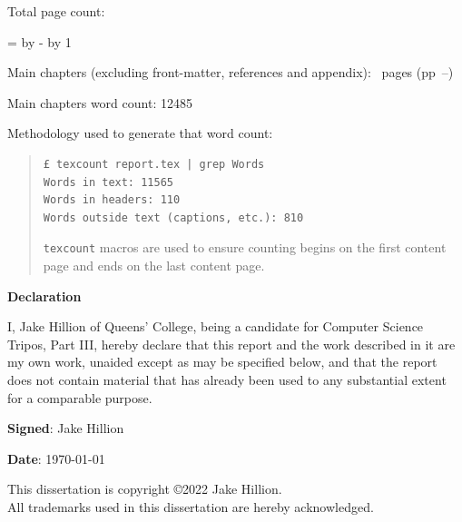 \documentclass[12pt,a4paper,twoside]{report}
\newif\ifsubmission %
\begin{document}
\begin{sffamily}
\newpage

Total page count: \pageref{lastpage}

\makeatletter
\@tempcnta=\relax%
\advance\@tempcnta by -%
\advance\@tempcnta by 1%
\xdef\contentpages{\the\@tempcnta}%
\makeatother

Main chapters (excluding front-matter, references and appendix):
\contentpages~pages
(pp~\pageref{firstcontentpage}--\pageref{lastcontentpage})

Main chapters word count: 12485

Methodology used to generate that word count:

\begin{quote}
\begin{verbatim}
£ texcount report.tex | grep Words
Words in text: 11565
Words in headers: 110
Words outside text (captions, etc.): 810
\end{verbatim}

\texttt{texcount} macros are used to ensure counting begins on the first content page and ends on the last content page.
\end{quote}

\end{sffamily}

\onehalfspacing

\ifsubmission\else

\newpage
{\Huge \bf Declaration}

\vspace{24pt}

I, Jake Hillion of Queens' College, being a candidate for Computer
Science Tripos, Part III, hereby declare that this report and the
work described in it are my own work, unaided except as may be
specified below, and that the report does not contain material that
has already been used to any substantial extent for a comparable
purpose.

\vspace{60pt}
\textbf{Signed}:  Jake Hillion

\vspace{12pt}
\textbf{Date}: \today


\vfill

This dissertation is copyright \copyright 2022 Jake Hillion. 
\\
All trademarks used in this dissertation are hereby acknowledged.
\end{document}
